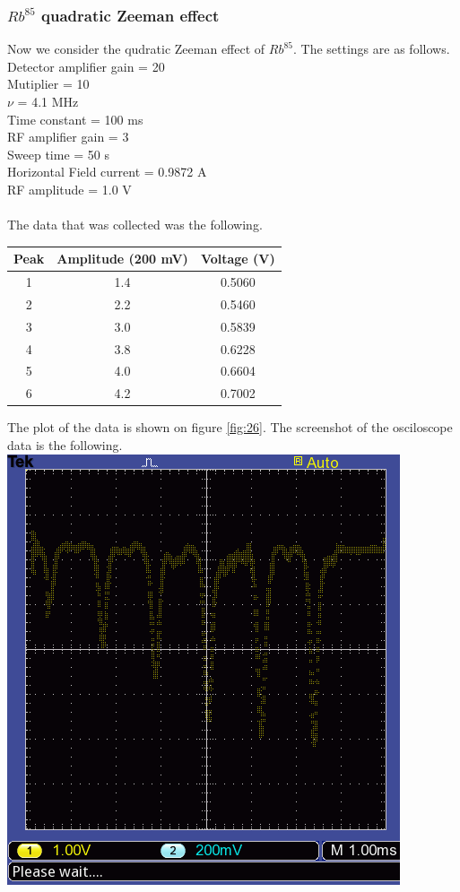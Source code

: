 \documentclass[twocolumn]{article}
\begin{document}
\subsubsection{$Rb^{85}$ quadratic Zeeman effect}
Now we consider the qudratic Zeeman effect of $Rb^{85}$. The settings are as 
follows.
\\
Detector amplifier gain = 20 \\
Mutiplier = 10 \\
$\nu$ = 4.1 MHz \\
Time constant = 100 ms \\
RF amplifier gain = 3 \\
Sweep time = 50 s \\
Horizontal Field current = 0.9872 A \\
RF amplitude = 1.0 V \\
\\
The data that was collected was the following.
\begin{minipage}{\linewidth}
\center
\begin{tabular}{|c|c|c|}
\hline
Peak & Amplitude (200 mV) & Voltage (V) \\ \hline
1 & 1.4 & 0.5060 \\ \hline
2 & 2.2 & 0.5460 \\ \hline
3 & 3.0 & 0.5839 \\ \hline
4 & 3.8 & 0.6228 \\ \hline
5 & 4.0 & 0.6604 \\ \hline
6 & 4.2 & 0.7002 \\ \hline
\end{tabular}
\label{tbl:10}
\end{minipage}
The plot of the data is shown on figure \ref{fig:26}. The screenshot of the 
osciloscope data is the following.
\center
\includegraphics[width=\linewidth]{pictures/rb85-low-raw.png}
\end{document}
